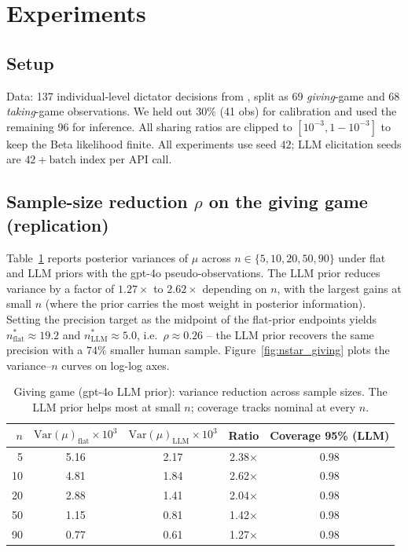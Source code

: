 \documentclass[11pt]{article}
\begin{document}
\section{Experiments}

\subsection{Setup}

Data: 137 individual-level dictator decisions from \citet{vonblanckenburg2023giving},
split as 69 \emph{giving}-game and 68 \emph{taking}-game observations. We held out 30\%
(41 obs) for calibration and used the remaining 96 for inference. All sharing ratios are
clipped to $[10^{-3}, 1-10^{-3}]$ to keep the Beta likelihood finite. All experiments use
seed $42$; LLM elicitation seeds are $42+\text{batch index}$ per API call.

\subsection{Sample-size reduction $\rho$ on the giving game (replication)}

Table~\ref{tab:gp_giving} reports posterior variances of $\mu$ across $n \in \{5,10,20,50,90\}$
under flat and LLM priors with the gpt-4o pseudo-observations. The LLM prior reduces variance
by a factor of $1.27\times$ to $2.62\times$ depending on $n$, with the largest gains at small
$n$ (where the prior carries the most weight in posterior information). Setting the precision
target as the midpoint of the flat-prior endpoints yields
$n^*_{\mathrm{flat}} \approx 19.2$ and $n^*_{\mathrm{LLM}} \approx 5.0$, i.e.\
$\rho \approx 0.26$ -- the LLM prior recovers the same precision with a $74\%$
smaller human sample. Figure~\ref{fig:nstar_giving} plots the variance--$n$ curves on log-log axes.

\begin{table}[h]
  \centering
  \small
  \begin{tabular}{rcccc}
    \toprule
    $n$ & $\mathrm{Var}(\mu)_{\mathrm{flat}} \times 10^3$ & $\mathrm{Var}(\mu)_{\mathrm{LLM}} \times 10^3$
        & Ratio & Coverage 95\% (LLM) \\
    \midrule
    5   & 5.16 & 2.17 & 2.38$\times$ & 0.98 \\
    10  & 4.81 & 1.84 & 2.62$\times$ & 0.98 \\
    20  & 2.88 & 1.41 & 2.04$\times$ & 0.98 \\
    50  & 1.15 & 0.81 & 1.42$\times$ & 0.98 \\
    90  & 0.77 & 0.61 & 1.27$\times$ & 0.98 \\
    \bottomrule
  \end{tabular}
  \caption{Giving game (gpt-4o LLM prior): variance reduction across sample sizes. The LLM
  prior helps most at small $n$; coverage tracks nominal at every $n$.}
  \label{tab:gp_giving}
\end{table}
\end{document}
